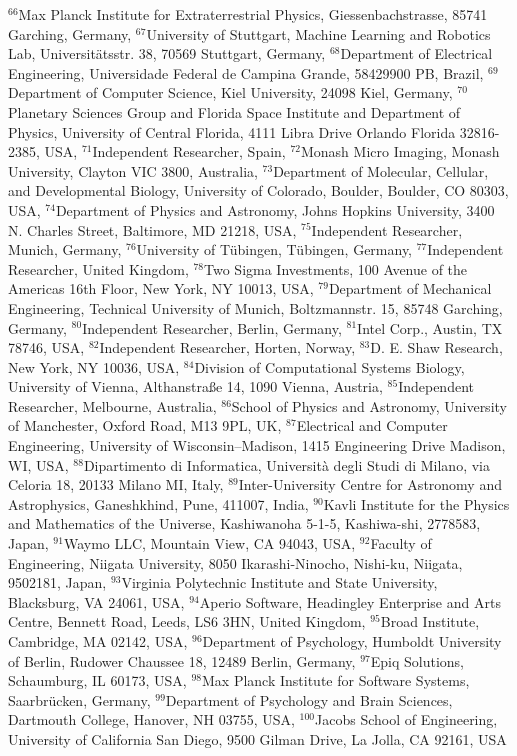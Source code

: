 $^{66}$Max Planck Institute for Extraterrestrial Physics, Giessenbachstrasse, 85741 Garching, Germany, 
$^{67}$University of Stuttgart, Machine Learning and Robotics Lab, Universitätsstr. 38, 70569 Stuttgart, Germany, 
$^{68}$Department of Electrical Engineering, Universidade Federal de Campina Grande, 58429900 PB, Brazil, 
$^{69}$Department of Computer Science, Kiel University, 24098 Kiel, Germany, 
$^{70}$Planetary Sciences Group and Florida Space Institute and Department of Physics, University of Central Florida, 4111 Libra Drive Orlando Florida 32816-2385, USA, 
$^{71}$Independent Researcher, Spain, 
$^{72}$Monash Micro Imaging, Monash University, Clayton VIC 3800, Australia, 
$^{73}$Department of Molecular, Cellular, and Developmental Biology, University of Colorado, Boulder, Boulder, CO 80303, USA, 
$^{74}$Department of Physics and Astronomy, Johns Hopkins University, 3400 N. Charles Street, Baltimore, MD 21218, USA, 
$^{75}$Independent Researcher, Munich, Germany, 
$^{76}$University of T\"ubingen, T\"ubingen, Germany, 
$^{77}$Independent Researcher, United Kingdom, 
$^{78}$Two Sigma Investments, 100 Avenue of the Americas 16th Floor, New York, NY 10013, USA, 
$^{79}$Department of Mechanical Engineering, Technical University of Munich, Boltzmannstr. 15, 85748 Garching, Germany, 
$^{80}$Independent Researcher, Berlin, Germany, 
$^{81}$Intel Corp., Austin, TX 78746, USA, 
$^{82}$Independent Researcher, Horten, Norway, 
$^{83}$D. E. Shaw Research, New York, NY 10036, USA, 
$^{84}$Division of Computational Systems Biology, University of Vienna, Althanstra{\ss}e 14, 1090 Vienna, Austria, 
$^{85}$Independent Researcher, Melbourne, Australia, 
$^{86}$School of Physics and Astronomy, University of Manchester, Oxford Road, M13 9PL, UK, 
$^{87}$Electrical and Computer Engineering, University of Wisconsin--Madison, 1415 Engineering Drive Madison, WI, USA, 
$^{88}$Dipartimento di Informatica, Universit\`a degli Studi di Milano, via Celoria 18, 20133 Milano MI, Italy, 
$^{89}$Inter-University Centre for Astronomy and Astrophysics, Ganeshkhind, Pune, 411007, India, 
$^{90}$Kavli Institute for the Physics and Mathematics of the Universe, Kashiwanoha 5-1-5, Kashiwa-shi, 2778583, Japan, 
$^{91}$Waymo LLC, Mountain View, CA 94043, USA, 
$^{92}$Faculty of Engineering, Niigata University, 8050 Ikarashi-Ninocho, Nishi-ku, Niigata, 9502181, Japan, 
$^{93}$Virginia Polytechnic Institute and State University, Blacksburg, VA 24061, USA, 
$^{94}$Aperio Software, Headingley Enterprise and Arts Centre, Bennett Road, Leeds, LS6 3HN, United Kingdom, 
$^{95}$Broad Institute, Cambridge, MA 02142, USA, 
$^{96}$Department of Psychology, Humboldt University of Berlin, Rudower Chaussee 18, 12489 Berlin, Germany, 
$^{97}$Epiq Solutions, Schaumburg, IL 60173, USA, 
$^{98}$Max Planck Institute for Software Systems, Saarbr\"ucken, Germany, 
$^{99}$Department of Psychology and Brain Sciences, Dartmouth College, Hanover, NH 03755, USA, 
$^{100}$Jacobs School of Engineering, University of California San Diego, 9500 Gilman Drive, La Jolla, CA 92161, USA